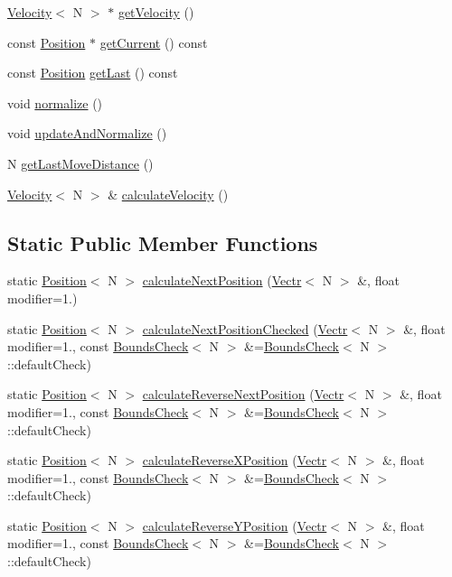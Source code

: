 \begin{DoxyCompactItemize}
\hyperlink{struct_velocity}{Velocity}$<$ N $>$ $\ast$ \hyperlink{struct_vectr_a5dc06bff7605656f5d5294db219339b6}{get\-Velocity} ()
\item 
const \hyperlink{struct_position}{Position} $\ast$ \hyperlink{struct_vectr_a0acef7840c315ea742390f8b96d6c782}{get\-Current} () const 
\item 
const \hyperlink{struct_position}{Position} \hyperlink{struct_vectr_a96b306b6f36bc82f9dd68633f3d3568f}{get\-Last} () const 
\item 
void \hyperlink{struct_vectr_aa8638eb9a06d4947a77f800b501e74f0}{normalize} ()
\item 
void \hyperlink{struct_vectr_a94b119ab4adb045161a80a5278dbe0f1}{update\-And\-Normalize} ()
\item 
N \hyperlink{struct_vectr_ae4c3aa958a6d74d96ff119e63c3ae6ea}{get\-Last\-Move\-Distance} ()
\item 
\hyperlink{struct_velocity}{Velocity}$<$ N $>$ \& \hyperlink{struct_vectr_a8ef008609006c8cd2afa56abac2bbe25}{calculate\-Velocity} ()
\end{DoxyCompactItemize}
\subsection*{Static Public Member Functions}
\begin{DoxyCompactItemize}
\item 
static \hyperlink{struct_position}{Position}$<$ N $>$ \hyperlink{struct_vectr_ad293e3f67a0483060d69b4de5dcfe5d2}{calculate\-Next\-Position} (\hyperlink{struct_vectr}{Vectr}$<$ N $>$ \&, float modifier=1.)
\item 
static \hyperlink{struct_position}{Position}$<$ N $>$ \hyperlink{struct_vectr_ac4d91db7639f1f74ba2492aaed2eb01d}{calculate\-Next\-Position\-Checked} (\hyperlink{struct_vectr}{Vectr}$<$ N $>$ \&, float modifier=1., const \hyperlink{struct_bounds_check}{Bounds\-Check}$<$ N $>$ \&=\hyperlink{struct_bounds_check}{Bounds\-Check}$<$ N $>$\-::default\-Check)
\item 
static \hyperlink{struct_position}{Position}$<$ N $>$ \hyperlink{struct_vectr_abeef5f4dfbd11b7c6bf40779cc191c0e}{calculate\-Reverse\-Next\-Position} (\hyperlink{struct_vectr}{Vectr}$<$ N $>$ \&, float modifier=1., const \hyperlink{struct_bounds_check}{Bounds\-Check}$<$ N $>$ \&=\hyperlink{struct_bounds_check}{Bounds\-Check}$<$ N $>$\-::default\-Check)
\item 
static \hyperlink{struct_position}{Position}$<$ N $>$ \hyperlink{struct_vectr_a7c8cfdf413bb152bcea5d14017220759}{calculate\-Reverse\-X\-Position} (\hyperlink{struct_vectr}{Vectr}$<$ N $>$ \&, float modifier=1., const \hyperlink{struct_bounds_check}{Bounds\-Check}$<$ N $>$ \&=\hyperlink{struct_bounds_check}{Bounds\-Check}$<$ N $>$\-::default\-Check)
\item 
static \hyperlink{struct_position}{Position}$<$ N $>$ \hyperlink{struct_vectr_ab897fda165e543696ecdc622af191698}{calculate\-Reverse\-Y\-Position} (\hyperlink{struct_vectr}{Vectr}$<$ N $>$ \&, float modifier=1., const \hyperlink{struct_bounds_check}{Bounds\-Check}$<$ N $>$ \&=\hyperlink{struct_bounds_check}{Bounds\-Check}$<$ N $>$\-::default\-Check)
\end{DoxyCompactItemize}

